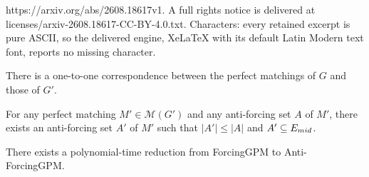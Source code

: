 \documentclass[10pt,a4paper]{amsart}
\newcommand{\AFGPM}{\sc Anti-ForcingGPM}
\newcommand{\FGPM}{\sc ForcingGPM} %
\begin{document}
https://arxiv.org/abs/2608.18617v1. A full rights notice is delivered at licenses/arxiv-2608.18617-CC-BY-4.0.txt. Characters: every retained excerpt is pure ASCII, so the delivered engine, XeLaTeX with its default Latin Modern text font, reports no missing character.
\begin{lemma} \label{lem:one-to-one}
There is a one-to-one correspondence between the perfect matchings of $G$ and those of $G'$.
\end{lemma}

\begin{lemma} \label{lem:replace_A}
For any perfect matching $M' \in \mathcal{M}(G')$ and any anti-forcing set $A$ of $M'$, there exists an anti-forcing set $A'$ of $M'$ such that $|A'| \le |A|$ and $A'\subseteq E_{\textnormal{mid}}$.
\end{lemma}

\begin{theorem}\label{thm:FGPMtoAFGPM_reduction}
There exists a polynomial-time reduction from {\FGPM} to {\AFGPM}.
\end{theorem}
\end{document}
